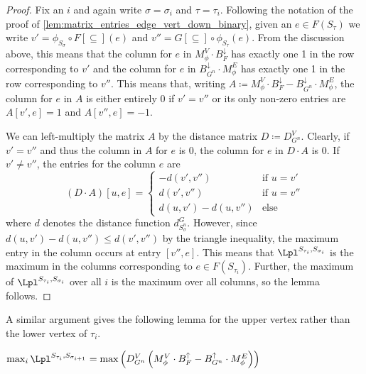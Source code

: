 \begin{proof} 
%
Fix an $i$ and again write $\sigma = \sigma_i$ and $\tau = \tau_i$. 
Following the notation of the proof of \cref{lem:matrix_entries_edge_vert_down_binary}, given an $e \in F(S_{\tau})$ we write $v' = \phi_{S_\sigma}\circ F[\subseteq](e)$ and $v'' = G[\subseteq]\circ \phi_{S_\tau}(e) $. 
From the discussion above, this means that the column for $e$ in $M_{\phi}^V \cdot B_F^{\downarrow}$ has exactly one 1 in the row corresponding to $v'$ and the column for $e$ in $B_{G^n}^{\downarrow} \cdot M_{\phi}^E$ has exactly one 1 in the row corresponding to $v''$. 
This means that, writing $A\coloneqq M_{\phi}^V \cdot B_F^{\downarrow} - B_{G^n}^{\downarrow} \cdot M_{\phi}^E$, the column for $e$ in $A$ is either entirely 0 if $v' = v''$ or its only non-zero entries are $A[v',e] = 1$ and $A[v'',e] = -1$. 

We can  left-multiply the matrix $A$ by the distance matrix $D\coloneqq D_{G^{n}}^V$.
Clearly, if $v' = v''$ and thus the column in $A$ for $e$ is 0, the column for $e$ in $D \cdot A$ is 0. 
If $v' \neq v''$, the entries for the column $e$ are 
\begin{equation*}
    (D \cdot A)[u,e] = 
    \begin{cases}
        -d(v',v'') & \text{if } u = v'\\
        d(v',v'') & \text{if } u = v'' \\
        d(u,v') - d(u,v'') & \text{else}
    \end{cases}
\end{equation*}
where $d$ denotes the distance function $d^G_{S^n_\sigma}$. 
However, since $d(u,v') - d(u,v'') \leq d(v',v'')$ by the triangle inequality, the maximum entry in the column occurs at entry $[v'', e]$. 
This means that $\Lpl^{S_{\tau_i}, S_{\sigma_i}}$ is the maximum in the columns corresponding to $e \in F(S_{\tau_i})$. 
Further, the maximum of $\Lpl^{S_{\tau_i}, S_{\sigma_i}}$ over all $i$ is the maximum over all columns, so the lemma follows. 
\end{proof} 

A similar argument gives the following lemma for the upper vertex rather than the lower vertex of $\tau_i$. 
\begin{lemma}
\label{lem:matrix_entries_edge_vert_up}
    $\max_{i} \Lpl^{S_{\tau_i}, S_{\sigma_{i+1}}} = \max \left( D_{G^n}^V \left(M_{\phi}^V \cdot B_F^{\uparrow} - B_{G^n}^{\uparrow} \cdot M_{\phi}^E\right) \right)$
\end{lemma}

